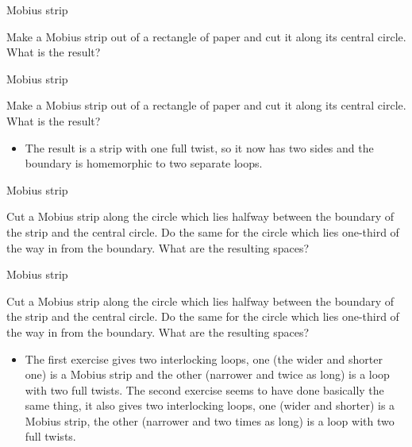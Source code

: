 \documentclass{beamer}
\begin{document}
\begin{frame}{Mobius strip}
  \begin{block}{}
    Make a Mobius strip out of a rectangle of paper and cut it along its central circle. What is the result?
  \end{block}
\end{frame}

\begin{frame}{Mobius strip}
  \begin{block}{}
    Make a Mobius strip out of a rectangle of paper and cut it along its central circle. What is the result?
    \begin{itemize}
    \item The result is a strip with one full twist, so it now has two sides and the boundary is homemorphic to two separate loops.
    \end{itemize}
  \end{block}
\end{frame}

\begin{frame}{Mobius strip}
  \begin{block}{}
    Cut a Mobius strip along the circle which lies halfway between the boundary of the strip and the central circle. Do the same for the circle which lies one-third of the way in from the boundary. What are the resulting spaces?
  \end{block}
\end{frame}

\begin{frame}{Mobius strip}
  \begin{block}{}
    Cut a Mobius strip along the circle which lies halfway between the boundary of the strip and the central circle. Do the same for the circle which lies one-third of the way in from the boundary. What are the resulting spaces?
    \begin{itemize}
    \item The first exercise gives two interlocking loops, one (the wider and shorter one) is a Mobius strip and the other (narrower and twice as long) is a loop with two full twists. The second exercise seems to have done basically the same thing, it also gives two interlocking loops, one (wider and shorter) is a Mobius strip, the other (narrower and two times as long) is a loop with two full twists.
    \end{itemize}
  \end{block}
\end{frame}
\end{document}
